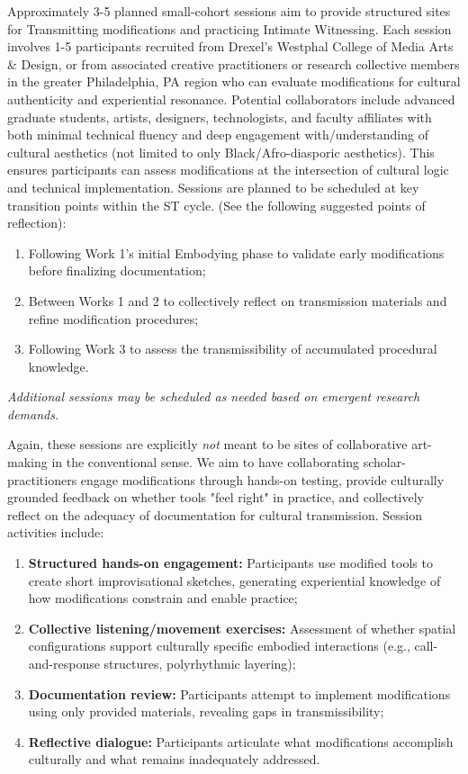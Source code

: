 Approximately 3-5 planned small-cohort sessions aim to provide structured sites for Transmitting modifications and practicing Intimate Witnessing. Each session involves 1-5 participants recruited from Drexel's Westphal College of Media Arts \& Design, or from associated creative practitioners or research collective members in the greater Philadelphia, PA region who can evaluate modifications for cultural authenticity and experiential resonance. Potential collaborators include advanced graduate students, artists, designers, technologists, and faculty affiliates with both minimal technical fluency and deep engagement with/understanding of cultural aesthetics (not limited to only Black/Afro-diasporic aesthetics). This ensures participants can assess modifications at the intersection of cultural logic and technical implementation. Sessions are planned to be scheduled at key transition points within the ST cycle. (See the following suggested points of reflection):

\begin{enumerate}[nosep]
	\item Following Work 1's initial Embodying phase to validate early modifications before finalizing documentation;
	\item Between Works 1 and 2 to collectively reflect on transmission materials and refine modification procedures;
	\item Following Work 3 to assess the transmissibility of accumulated procedural knowledge.
\end{enumerate}

\textit{Additional sessions may be scheduled as needed based on emergent research demands.}

Again, these sessions are explicitly \textit{not} meant to be sites of collaborative art-making in the conventional sense. We aim to have collaborating scholar-practitioners engage modifications through hands-on testing, provide culturally grounded feedback on whether tools "feel right" in practice, and collectively reflect on the adequacy of documentation for cultural transmission. Session activities include:

\begin{enumerate}[nosep]
	\item \textbf{Structured hands-on engagement:} Participants use modified tools to create short improvisational sketches, generating experiential knowledge of how modifications constrain and enable practice;
	\item \textbf{Collective listening/movement exercises:} Assessment of whether spatial configurations support culturally specific embodied interactions (e.g., call-and-response structures, polyrhythmic layering);
	\item \textbf{Documentation review:} Participants attempt to implement modifications using only provided materials, revealing gaps in transmissibility;
	\item \textbf{Reflective dialogue:} Participants articulate what modifications accomplish culturally and what remains inadequately addressed.
\end{enumerate}

